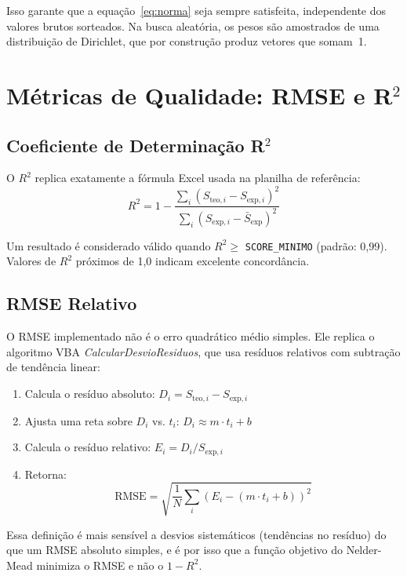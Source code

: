 \documentclass[12pt,a4paper]{report}
\newcommand{\code}[1]{\texttt{#1}}
\begin{document}
Isso garante que a equação~\ref{eq:norma} seja sempre satisfeita, independente
dos valores brutos sorteados. Na busca aleatória, os pesos são amostrados
de uma distribuição de Dirichlet, que por construção produz vetores que
somam~1.

\section{Métricas de Qualidade: RMSE e R\texorpdfstring{$^2$}{2}}

\subsection{Coeficiente de Determinação R\texorpdfstring{$^2$}{2}}

O $R^2$ replica exatamente a fórmula Excel usada na planilha de referência:
\begin{equation}
  R^2 = 1 - \frac{\sum_i (S_{\text{teo},i} - S_{\text{exp},i})^2}
                 {\sum_i (S_{\text{exp},i} - \bar{S}_{\text{exp}})^2}
  \label{eq:r2}
\end{equation}

Um resultado é considerado válido quando $R^2 \geq$ \code{SCORE\_MINIMO}
(padrão: 0,99). Valores de $R^2$ próximos de 1,0 indicam excelente concordância.

\subsection{RMSE Relativo}

O RMSE implementado não é o erro quadrático médio simples. Ele replica o
algoritmo VBA \textit{CalcularDesvioResiduos}, que usa resíduos relativos
com subtração de tendência linear:

\begin{enumerate}
  \item Calcula o resíduo absoluto: $D_i = S_{\text{teo},i} - S_{\text{exp},i}$
  \item Ajusta uma reta sobre $D_i$ vs. $t_i$: $D_i \approx m \cdot t_i + b$
  \item Calcula o resíduo relativo: $E_i = D_i / S_{\text{exp},i}$
  \item Retorna:
  \[
    \text{RMSE} = \sqrt{\frac{1}{N}\sum_i (E_i - (m \cdot t_i + b))^2}
  \]
\end{enumerate}

Essa definição é mais sensível a desvios sistemáticos (tendências no resíduo)
do que um RMSE absoluto simples, e é por isso que a função objetivo do Nelder-Mead
minimiza o RMSE e não o $1 - R^2$.
\end{document}
